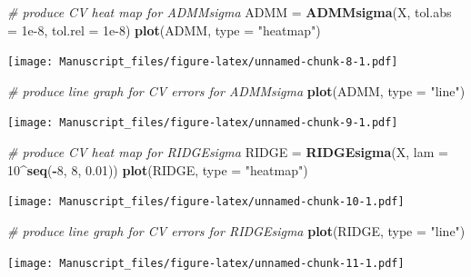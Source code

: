 \documentclass[12pt,]{book}
\newenvironment{Shaded}{\begin{snugshade}}{\end{snugshade}}
\newcommand{\CommentTok}[1]{\textcolor[rgb]{0.56,0.35,0.01}{\textit{#1}}}
\newcommand{\DataTypeTok}[1]{\textcolor[rgb]{0.13,0.29,0.53}{#1}}
\newcommand{\DecValTok}[1]{\textcolor[rgb]{0.00,0.00,0.81}{#1}}
\newcommand{\FloatTok}[1]{\textcolor[rgb]{0.00,0.00,0.81}{#1}}
\newcommand{\KeywordTok}[1]{\textcolor[rgb]{0.13,0.29,0.53}{\textbf{#1}}}
\newcommand{\NormalTok}[1]{#1}
\newcommand{\OperatorTok}[1]{\textcolor[rgb]{0.81,0.36,0.00}{\textbf{#1}}}
\newcommand{\StringTok}[1]{\textcolor[rgb]{0.31,0.60,0.02}{#1}}
\theoremstyle{definition}
\theoremstyle{definition}
\theoremstyle{definition}
\theoremstyle{remark}
\begin{document}
\vspace{0.5cm}

\begin{Shaded}
\begin{Highlighting}[]
\CommentTok{# produce CV heat map for ADMMsigma}
\NormalTok{ADMM =}\StringTok{ }\KeywordTok{ADMMsigma}\NormalTok{(X, }\DataTypeTok{tol.abs =} \FloatTok{1e-8}\NormalTok{, }\DataTypeTok{tol.rel =} \FloatTok{1e-8}\NormalTok{)}
\KeywordTok{plot}\NormalTok{(ADMM, }\DataTypeTok{type =} \StringTok{"heatmap"}\NormalTok{)}
\end{Highlighting}
\end{Shaded}

\texttt{[image: Manuscript\_files/figure-latex/unnamed-chunk-8-1.pdf]}
\newpage

\begin{Shaded}
\begin{Highlighting}[]
\CommentTok{# produce line graph for CV errors for ADMMsigma}
\KeywordTok{plot}\NormalTok{(ADMM, }\DataTypeTok{type =} \StringTok{"line"}\NormalTok{)}
\end{Highlighting}
\end{Shaded}

\texttt{[image: Manuscript\_files/figure-latex/unnamed-chunk-9-1.pdf]}
\newpage

\begin{Shaded}
\begin{Highlighting}[]
\CommentTok{# produce CV heat map for RIDGEsigma}
\NormalTok{RIDGE =}\StringTok{ }\KeywordTok{RIDGEsigma}\NormalTok{(X, }\DataTypeTok{lam =} \DecValTok{10}\OperatorTok{^}\KeywordTok{seq}\NormalTok{(}\OperatorTok{-}\DecValTok{8}\NormalTok{, }\DecValTok{8}\NormalTok{, }\FloatTok{0.01}\NormalTok{))}
\KeywordTok{plot}\NormalTok{(RIDGE, }\DataTypeTok{type =} \StringTok{"heatmap"}\NormalTok{)}
\end{Highlighting}
\end{Shaded}

\texttt{[image: Manuscript\_files/figure-latex/unnamed-chunk-10-1.pdf]}

\newpage

\begin{Shaded}
\begin{Highlighting}[]
\CommentTok{# produce line graph for CV errors for RIDGEsigma}
\KeywordTok{plot}\NormalTok{(RIDGE, }\DataTypeTok{type =} \StringTok{"line"}\NormalTok{)}
\end{Highlighting}
\end{Shaded}

\texttt{[image: Manuscript\_files/figure-latex/unnamed-chunk-11-1.pdf]}
\end{document}
